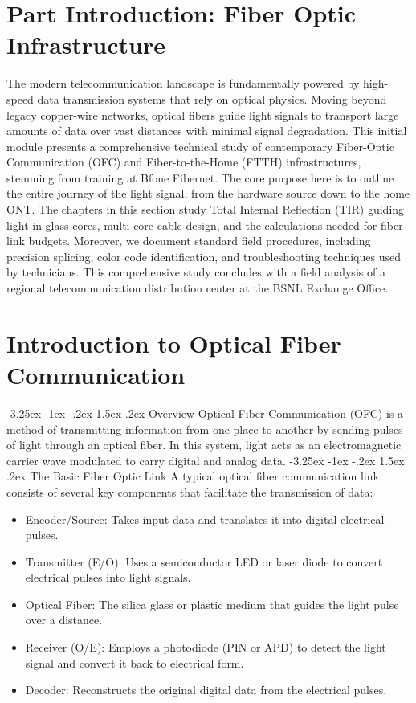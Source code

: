 \documentclass[11pt,a4paper]{report}
\makeatletter
\renewcommand{\section}{\@startsection{section}{1}{\z@}%
  {-3.25ex \@plus -1ex \@minus -.2ex}%
  {1.5ex \@plus.2ex}%
  {\normalfont\Large\bfseries\color{primaryColor}}}
\makeatother
\begin{document}
\chapter*{Part Introduction: Fiber Optic Infrastructure}
The modern telecommunication landscape is fundamentally powered by high-speed data transmission systems that rely on optical physics. Moving beyond legacy copper-wire networks, optical fibers guide light signals to transport large amounts of data over vast distances with minimal signal degradation. This initial module presents a comprehensive technical study of contemporary Fiber-Optic Communication (OFC) and Fiber-to-the-Home (FTTH) infrastructures, stemming from training at Bfone Fibernet. The core purpose here is to outline the entire journey of the light signal, from the hardware source down to the home ONT. The chapters in this section study Total Internal Reflection (TIR) guiding light in glass cores, multi-core cable design, and the calculations needed for fiber link budgets. Moreover, we document standard field procedures, including precision splicing, color code identification, and troubleshooting techniques used by technicians. This comprehensive study concludes with a field analysis of a regional telecommunication distribution center at the BSNL Exchange Office.
\chapter{Introduction to Optical Fiber Communication}
\section{Overview}
Optical Fiber Communication (OFC) is a method of transmitting information from one place to another by sending pulses of light through an optical fiber. In this system, light acts as an electromagnetic carrier wave modulated to carry digital and analog data.
\section{The Basic Fiber Optic Link}
A typical optical fiber communication link consists of several key components that facilitate the transmission of data:
\begin{itemize}
  \item Encoder/Source: Takes input data and translates it into digital electrical pulses.
  \item Transmitter (E/O): Uses a semiconductor LED or laser diode to convert electrical pulses into light signals.
  \item Optical Fiber: The silica glass or plastic medium that guides the light pulse over a distance.
  \item Receiver (O/E): Employs a photodiode (PIN or APD) to detect the light signal and convert it back to electrical form.
  \item Decoder: Reconstructs the original digital data from the electrical pulses.
\end{itemize}
\end{document}
